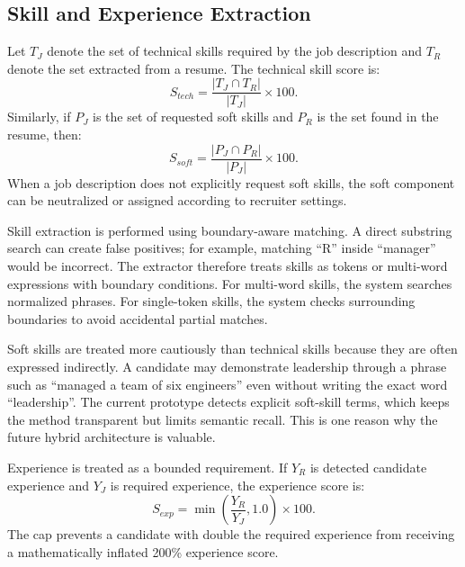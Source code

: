 \documentclass[conference]{IEEEtran}
\begin{document}
\subsection{Skill and Experience Extraction}
Let \(T_J\) denote the set of technical skills required by the job description and \(T_R\) denote the set extracted from a resume. The technical skill score is:
\begin{equation}
S_{tech}=\frac{|T_J \cap T_R|}{|T_J|}\times 100.
\end{equation}
Similarly, if \(P_J\) is the set of requested soft skills and \(P_R\) is the set found in the resume, then:
\begin{equation}
S_{soft}=\frac{|P_J \cap P_R|}{|P_J|}\times 100.
\end{equation}
When a job description does not explicitly request soft skills, the soft component can be neutralized or assigned according to recruiter settings.

Skill extraction is performed using boundary-aware matching. A direct substring search can create false positives; for example, matching ``R'' inside ``manager'' would be incorrect. The extractor therefore treats skills as tokens or multi-word expressions with boundary conditions. For multi-word skills, the system searches normalized phrases. For single-token skills, the system checks surrounding boundaries to avoid accidental partial matches.

Soft skills are treated more cautiously than technical skills because they are often expressed indirectly. A candidate may demonstrate leadership through a phrase such as ``managed a team of six engineers'' even without writing the exact word ``leadership''. The current prototype detects explicit soft-skill terms, which keeps the method transparent but limits semantic recall. This is one reason why the future hybrid architecture is valuable.

Experience is treated as a bounded requirement. If \(Y_R\) is detected candidate experience and \(Y_J\) is required experience, the experience score is:
\begin{equation}
S_{exp}=\min\left(\frac{Y_R}{Y_J},1.0\right)\times 100.
\end{equation}
The cap prevents a candidate with double the required experience from receiving a mathematically inflated 200\% experience score.
\end{document}
